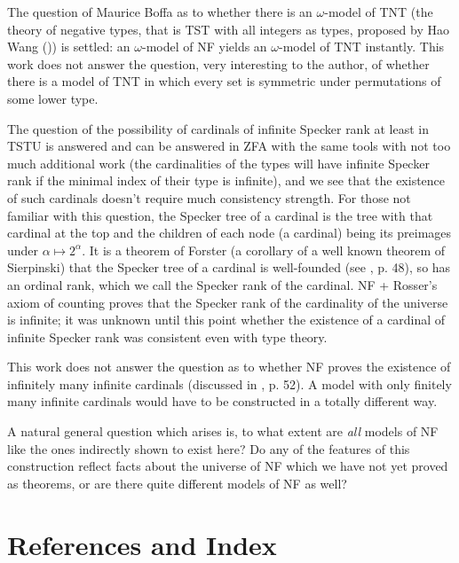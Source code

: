 \documentclass{article}
\begin{document}
The question of Maurice Boffa as to whether there is an $\omega$-model of TNT (the theory of negative types, that is TST with all integers as types, proposed by Hao Wang  (\cite{tnt})) is settled:  an $\omega$-model of NF yields an $\omega$-model of TNT instantly.  This work does not answer the question, very interesting to the author, of whether there is a model of TNT in which every set is symmetric under permutations of some lower type.

The question of the possibility of cardinals of infinite Specker rank at least in TSTU  is answered  and can be answered in ZFA with the same tools with not too much additional work (the cardinalities of the types will have infinite Specker rank if the minimal index of their type is infinite), and we see that the existence of such cardinals doesn't require much consistency strength.  For those not familiar with this question, the Specker tree of a cardinal is the tree with that cardinal at the top and the children of each node (a cardinal) being its preimages under $\alpha \mapsto 2^{\alpha}$.   It is a theorem of Forster (a corollary of a well known theorem of Sierpinski) that the Specker tree of a cardinal is well-founded  (see \cite{forster}, p. 48), so has an ordinal rank, which we call the Specker rank of the cardinal.   NF + Rosser's axiom of counting proves that the Specker rank of the cardinality of the universe is infinite;  it was unknown until this point whether the existence of a cardinal of infinite Specker rank was consistent even with type theory.

This work does not answer the question as to whether NF proves the existence of infinitely many infinite cardinals (discussed in \cite{forster}, p. 52).  A model with only finitely many infinite cardinals would have to be constructed in a totally different way.

A natural general question which arises is, to what extent are {\em all\/} models of NF like the ones indirectly shown to exist here?  Do any of the features of this construction reflect facts about the universe of NF which we have not yet proved as theorems, or are there quite different models of NF as well?

\newpage

\section{References and Index}
\end{document}
